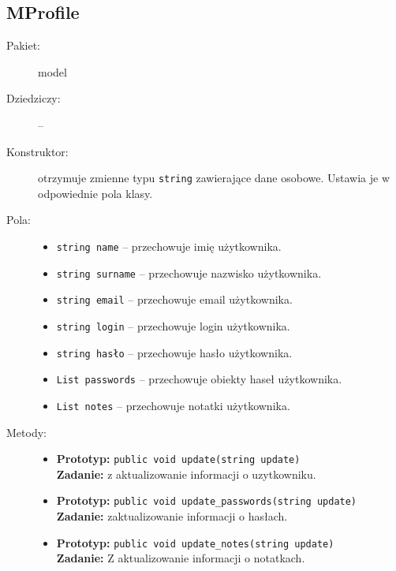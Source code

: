 \documentclass[a4paper]{article}
\newcommand{\prog}{\texttt}
\begin{document}
\subsection{MProfile}
\begin{description}
    \item[Pakiet:] model
    \item[Dziedziczy:] --
    \item[Konstruktor:] otrzymuje zmienne typu \prog{string} zawierające dane osobowe. Ustawia je w odpowiednie pola klasy.
    \item[Pola:] \hfill
    \begin{itemize}
        \item \prog{string name} -- przechowuje imię użytkownika.
        \item \prog{string surname} -- przechowuje nazwisko użytkownika.
        \item \prog{string email} -- przechowuje email użytkownika.
        \item \prog{string login} -- przechowuje login użytkownika.
        \item \prog{string hasło} -- przechowuje hasło użytkownika.
        \item \prog{List passwords} -- przechowuje obiekty haseł użytkownika.
        \item \prog{List notes} -- przechowuje notatki użytkownika.
    \end{itemize}
    \item[Metody:] \hfill
    \begin{itemize}
        \item \textbf{Prototyp:} \prog{public void update(string update)}\\\textbf{Zadanie:} z aktualizowanie informacji o uzytkowniku.
        \item \textbf{Prototyp:} \prog{public void update\_passwords(string update)}\\\textbf{Zadanie:} zaktualizowanie informacji o hasłach.
        \item \textbf{Prototyp:} \prog{public void update\_notes(string update)}\\\textbf{Zadanie:} Z aktualizowanie informacji o notatkach.
    \end{itemize}
\end{description}
\end{document}
